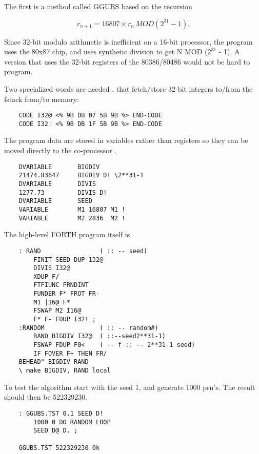 The first is a method called GGUBS  based on the recursion

\begin{equation}
    r_{n+1} = 16807 \times{} r_n \, MOD (2^{31} - 1) .\nonumber
\end{equation}

Since 32-bit modulo arithmetic is inefficient on a 16-bit processor, the
program uses the 80x87 chip, and uses synthetic division
to get N MOD ($2^{31}$ - 1). A version that uses the 32-bit registers
of the 80386/80486 would not be hard to program.

Two specialized words are needed 
, that fetch/store 32-bit integers to/from the fstack from/to memory:

\begin{verbatim}
    CODE I32@ <% 9B DB 07 5B 9B %> END-CODE
    CODE I32! <% 9B DB 1F 5B 9B %> END-CODE
\end{verbatim}

The program data are stored in variables rather than registers so
they can be moved directly to the co-processor  .

\begin{verbatim}
    DVARIABLE       BIGDIV
    21474.83647     BIGDIV D! \2**31-1
    DVARIABLE       DIVIS
    1277.73         DIVIS D!
    DVARIABLE       SEED
    VARIABLE        M1 16807 M1 !
    VARIABLE        M2 2836  M2 !
\end{verbatim}

The high-level FORTH program itself is

\begin{verbatim}
    : RAND                ( :: -- seed)
        FINIT SEED DUP 132@
        DIVIS I32@
        XDUP F/
        FTFIUNC FRNDINT
        FUNDER F* FROT FR-
        M1 |16@ F*
        FSWAP M2 I16@
        F* F- FDUP I32! ;
    :RANDOM               ( :: -- random#)
        RAND BIGDIV I32@  ( ::--seed2**31-1)
        FSWAP FDUP F0<    ( -- f :: -- 2**31-1 seed)
        IF FOVER F+ THEN FR/
    BEHEAD" BIGDIV RAND
    \ make BIGDIV, RAND local
\end{verbatim}
To test the algorithm start with the seed 1, and generate 1000
prn's. The result should then be 522329230.

\begin{verbatim}
    : GGUBS.TST 0.1 SEED D!
        1000 0 DO RANDOM LOOP
        SEED D@ D. ;

    GGUBS.TST 522329230 0k
\end{verbatim}

